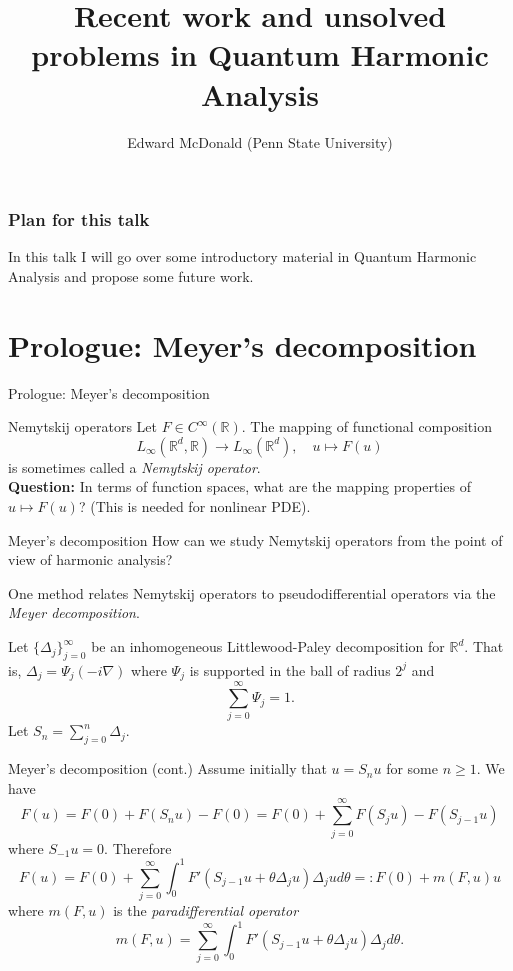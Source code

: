 \documentclass{beamer}
\newcommand\makebeamertitle{\frame{\maketitle}}%
\numberwithin{equation}{section}
\theoremstyle{plain}
\theoremstyle{plain}
\theoremstyle{definition}
\theoremstyle{plain}
\theoremstyle{plain}
\theoremstyle{definition}
\newcommand{\Rl}{\mathbb{R}}
\begin{document}
\title[Progress and Questions in QHA]{Recent work and unsolved problems in Quantum Harmonic Analysis}

\author[E. McDonald]{Edward McDonald (Penn State University)}



\makebeamertitle

\begin{frame}\frametitle{Plan for this talk}
    In this talk I will go over some introductory material in Quantum Harmonic Analysis and propose some future work.
\end{frame}

\section{Prologue: Meyer's decomposition}\label{meyer_section}

\begin{frame}
    \Huge{Prologue: Meyer's decomposition}
\end{frame}


\begin{frame}{Nemytskij operators}
    Let $F\in C^\infty(\Rl).$ The mapping of functional composition
    \[
        L_{\infty}(\Rl^d,\Rl)\to L_{\infty}(\Rl^d),\quad u\mapsto F(u)
    \]
    is sometimes called a \emph{Nemytskij operator}.\\
\pause
    \textbf{Question:} In terms of function spaces, what are the mapping properties of $u\mapsto F(u)$? (This is needed for nonlinear PDE).
\end{frame}

\begin{frame}{Meyer's decomposition}
    How can we study Nemytskij operators from the point of view of harmonic analysis?\pause

    One method relates Nemytskij operators to pseudodifferential operators via the \emph{Meyer decomposition}.\pause

    Let $\{\Delta_j\}_{j=0}^\infty$ be an inhomogeneous Littlewood-Paley decomposition for $\Rl^d.$ That is, $\Delta_j = \Psi_j(-i\nabla)$ where $\Psi_j$
    is supported in the ball of radius $2^j$ and
    \[
        \sum_{j=0}^\infty \Psi_j = 1.
    \]
    Let $S_n = \sum_{j=0}^n\Delta_j.$
\end{frame}

\begin{frame}{Meyer's decomposition (cont.)}
    Assume initially that $u=S_nu$ for some $n\geq 1.$ We have
    \[
        F(u) = F(0)+F(S_nu)-F(0) = F(0)+\sum_{j=0}^\infty F(S_ju)-F(S_{j-1}u)
    \]
    where $S_{-1}u=0.$ Therefore
    \[
        F(u) = F(0)+\sum_{j=0}^\infty \int_0^1 F'(S_{j-1}u+\theta \Delta_j u)\Delta_j u d\theta =: F(0)+m(F,u)u
    \]
    where $m(F,u)$ is the \emph{paradifferential operator}
    \[
        m(F,u) = \sum_{j=0}^\infty \int_0^1 F'(S_{j-1}u+\theta \Delta_ju)\Delta_j d\theta.
    \]
\end{frame}
\end{document}
